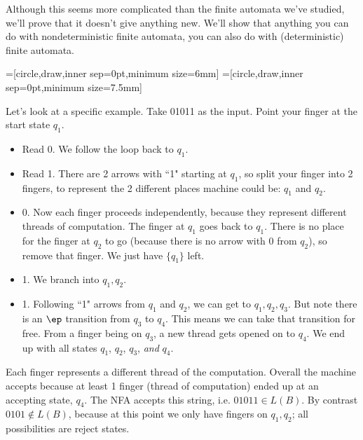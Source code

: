 Although this seems more complicated than the finite automata we've studied, we'll prove that it doesn't give anything new. We'll show that anything you can do with nondeterministic finite automata, you can also do with (deterministic) finite automata. 

=[circle,draw,inner sep=0pt,minimum size=6mm]
=[circle,draw,inner sep=0pt,minimum size=7.5mm]
\begin{center}
\end{center}

Let's look at a specific example. Take 01011 as the input. Point your finger at the start state $q_1$.
\begin{itemize}
\item
Read 0. We follow the loop back to $q_1$.
\item
Read 1. There are 2 arrows with ``1" starting at $q_1$, so split your finger into 2 fingers, to represent the 2 different places machine could be: $q_1$ and $q_2$.
\item 0. Now each finger proceeds independently, because they represent different threads of computation. The finger at $q_1$ goes back to $q_1$. There is no place for the finger at $q_2$ to go (because there is no arrow with 0 from $q_2$), so remove that finger. We just have $\{q_1\}$ left.
\item 1. We branch into $q_1,q_2$.
\item 1. Following ``1" arrows from $q_1$ and $q_2$, we can get to $q_1,q_2,q_3$. But note there is an $\ep$ transition from $q_3$ to $q_4$. This means we can take that transition for free. From a finger being on $q_3$, a new thread gets opened on to $q_4$. We end up with all states $q_1$, $q_2$, $q_3$, {\it and} $q_4$.
\end{itemize}
Each finger represents a different thread of the computation. Overall the machine accepts because at least 1 finger (thread of computation) ended up at an accepting state, $q_4$.
The NFA accepts this string, i.e. $01011\in L(B)$. By contrast $0101\nin L(B)$, because at this point we only have fingers on $q_1,q_2$; all possibilities are reject states.

